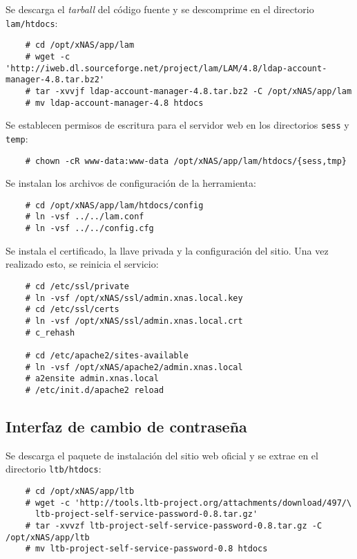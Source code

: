 Se descarga el \emph{\gls{tarball}} del c\'{o}digo fuente y se descomprime en el directorio \texttt{lam/htdocs}:

{
\scriptsize
\linespread{1}
\begin{verbatim}
    # cd /opt/xNAS/app/lam
    # wget -c 'http://iweb.dl.sourceforge.net/project/lam/LAM/4.8/ldap-account-manager-4.8.tar.bz2'
    # tar -xvvjf ldap-account-manager-4.8.tar.bz2 -C /opt/xNAS/app/lam
    # mv ldap-account-manager-4.8 htdocs
\end{verbatim}
}

Se establecen permisos de escritura para el servidor web en los directorios \texttt{sess} y \texttt{temp}:

{
\scriptsize
\linespread{1}
\begin{verbatim}
    # chown -cR www-data:www-data /opt/xNAS/app/lam/htdocs/{sess,tmp}
\end{verbatim}
}

Se instalan los archivos de configuraci\'{o}n de la herramienta:

{
\scriptsize
\linespread{1}
\begin{verbatim}
    # cd /opt/xNAS/app/lam/htdocs/config
    # ln -vsf ../../lam.conf
    # ln -vsf ../../config.cfg
\end{verbatim}
}

Se instala el certificado, la llave privada y la configuraci\'{o}n del sitio. Una vez realizado esto, se reinicia el servicio:

{
\scriptsize
\linespread{1}
\begin{verbatim}
    # cd /etc/ssl/private
    # ln -vsf /opt/xNAS/ssl/admin.xnas.local.key
    # cd /etc/ssl/certs
    # ln -vsf /opt/xNAS/ssl/admin.xnas.local.crt
    # c_rehash

    # cd /etc/apache2/sites-available
    # ln -vsf /opt/xNAS/apache2/admin.xnas.local
    # a2ensite admin.xnas.local
    # /etc/init.d/apache2 reload
\end{verbatim}
}

      \subsection {Interfaz de cambio de contrase\~{n}a}

Se descarga el paquete de instalaci\'{o}n del sitio web oficial y se extrae en el directorio \texttt{ltb/htdocs}:

{
\scriptsize
\linespread{1}
\begin{verbatim}
    # cd /opt/xNAS/app/ltb
    # wget -c 'http://tools.ltb-project.org/attachments/download/497/\
      ltb-project-self-service-password-0.8.tar.gz'
    # tar -xvvzf ltb-project-self-service-password-0.8.tar.gz -C /opt/xNAS/app/ltb
    # mv ltb-project-self-service-password-0.8 htdocs
\end{verbatim}
}

